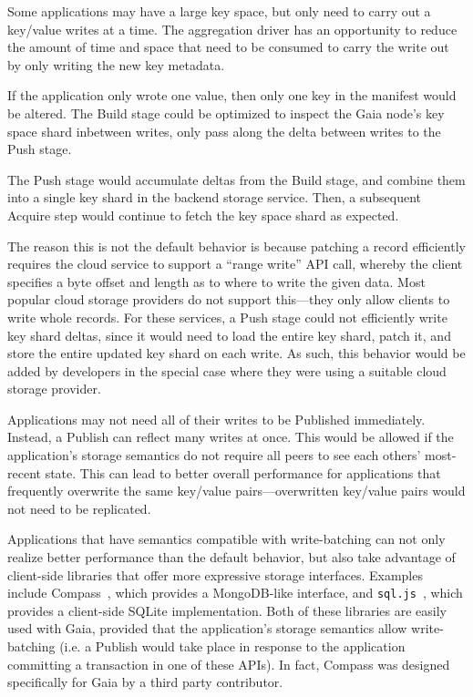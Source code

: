 \hfill \break
{}
\hfill \break

Some applications may have a large key space, but only need to carry out a
key/value writes at a time.
The aggregation driver has an opportunity to reduce the amount of time and space that
need to be consumed to carry the write out by only writing the new key metadata.

If the application only wrote one value, then only one key in the manifest would
be altered.  The Build stage could be optimized to inspect the Gaia node's 
key space shard inbetween writes, only pass along the delta between writes
to the Push stage.

The Push stage would accumulate deltas from the Build stage, and combine them
into a single key shard in the backend storage service.  Then, a subsequent
Acquire step would continue to fetch the key space shard as expected.

The reason this is not the default behavior is because patching a record
efficiently requires the cloud service to support a ``range write''
API call, whereby the client specifies a byte offset and length as to where to
write the given data.  Most popular cloud storage providers do not support
this---they only allow clients to write whole records.  For these services,
a Push stage could not efficiently write key shard deltas, since it would need
to load the entire key shard, patch it, and store the entire updated key shard
on each write.  As such, this behavior would be added by developers in the
special case where they were using a suitable cloud storage provider.

\hfill \break
{}
\hfill \break

Applications may not need all of their writes to be Published immediately.
Instead, a Publish can reflect many writes at once.  This would be allowed if
the application's storage semantics do not require all peers to see each others'
most-recent state.  This can lead to better overall performance for applications
that frequently overwrite the same key/value pairs---overwritten key/value pairs
would not need to be replicated.

Applications that have semantics compatible with write-batching can not only
realize better performance than the default behavior, but also take advantage of
client-side libraries that offer more expressive storage interfaces.
Examples include Compass~\cite{blockstack-compass}, which provides a
MongoDB-like interface, and \texttt{sql.js}~\cite{sql.js}, which provides a
client-side SQLite implementation.  Both of these libraries are easily used with
Gaia, provided that the application's storage semantics allow write-batching
(i.e. a Publish would take place in response to the application committing a
transaction in one of these APIs).  In fact, Compass was designed specifically
for Gaia by a third party contributor.

